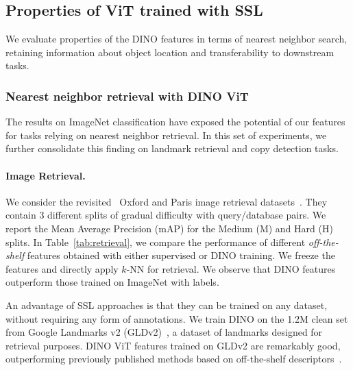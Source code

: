 \subsection{Properties of ViT trained with SSL}

We evaluate properties of the DINO features in terms of nearest neighbor search, retaining information about object location and transferability to downstream tasks.

\subsubsection{Nearest neighbor retrieval with DINO ViT} The results on ImageNet classification have exposed the potential of our features for tasks relying on nearest neighbor retrieval. In this set of experiments, we further consolidate this finding on landmark retrieval and copy detection tasks.

\paragraph{Image Retrieval.} We consider the revisited~\cite{radenovic2018revisiting} Oxford and Paris image retrieval datasets~\cite{philbin2008lost}. They contain 3 different splits of gradual difficulty with query/database pairs. We report the Mean Average Precision (mAP) for the Medium (M) and Hard (H) splits. In Table~\ref{tab:retrieval}, we compare the performance of different \emph{off-the-shelf} features obtained with either supervised or DINO training. We freeze the features and directly apply $k$-NN for retrieval. We observe that DINO features outperform those trained on ImageNet with labels.

An advantage of SSL approaches is that they can be trained on any dataset, without requiring any form of annotations. We train DINO on the 1.2M clean set from Google Landmarks v2 (GLDv2)~\cite{weyand2020google}, a dataset of landmarks designed for retrieval purposes. DINO ViT features trained on GLDv2 are remarkably good, outperforming previously published methods based on off-the-shelf descriptors~\cite{tolias2015particular,revaud2019learning}.

